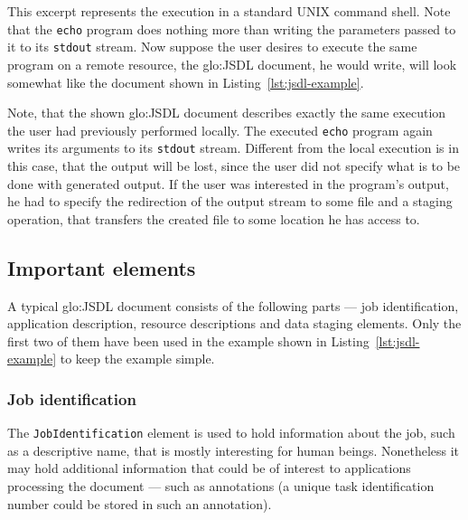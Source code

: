 This  excerpt  represents  the   execution  in  a  standard  UNIX  command
shell. Note that the \texttt{echo}  program does nothing more than writing
the parameters passed to it to its \texttt{stdout} stream. Now suppose the
user  desires  to execute  the  same program  on  a  remote resource,  the
\gls{glo:JSDL}  document, he  would  write, will  look  somewhat like  the
document shown in Listing~\ref{lst:jsdl-example}.

\bigskip

\begin{center}
  \begin{minipage}{.75\textwidth}
    
  \end{minipage}
\end{center}

Note, that  the shown \gls{glo:JSDL}  document describes exactly  the same
execution  the  user  had  previously  performed  locally.   The  executed
\texttt{echo} program  again writes  its arguments to  its \texttt{stdout}
stream.   Different from the  local execution  is in  this case,  that the
output will  be lost, since the  user did not  specify what is to  be done
with generated output. If the user was interested in the program's output,
he had to specify the redirection of  the output stream to some file and a
staging operation, that transfers the created file to some location he has
access to.

\subsection{Important elements}

A typical \gls{glo:JSDL} document consists  of the following parts --- job
identification,  application description,  resource descriptions  and data
staging elements. Only the first two of them have been used in the example
shown in Listing~\ref{lst:jsdl-example} to keep the example simple.

\subsubsection{Job identification}

The \texttt{JobIdentification}  element is used to  hold information about
the job, such as a descriptive  name, that is mostly interesting for human
beings.  Nonetheless it  may hold additional information that  could be of
interest to  applications processing the document ---  such as annotations
(\eg a  unique task  identification number  could  be stored  in such  an
annotation).

